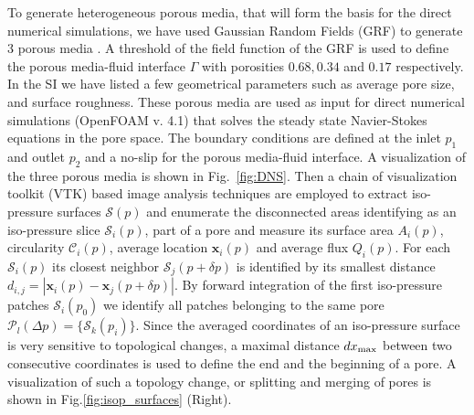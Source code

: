 \documentclass[draft]{agujournal2019}
\begin{document}
To generate heterogeneous porous media, that will form the basis for the direct numerical simulations, we have used Gaussian Random Fields (GRF) to generate 3 porous media \cite{teubner_level_1991,hyman_heterogeneities_2012,siena_relationship_2014}. A threshold of the field function of the GRF is used to define the porous media-fluid interface $\Gamma$ with porosities $0.68, 0.34$ and $0.17$ respectively. In the SI we have listed a few geometrical parameters such as average pore size, and surface roughness. These porous media are used as input for direct numerical simulations (OpenFOAM v. 4.1) \cite{weller_tensorial_1998} that solves the steady state Navier-Stokes equations in the pore space. The boundary conditions are defined at the inlet $p_1$ and outlet $p_2$ and a no-slip for the porous media-fluid interface. A visualization of the three porous media is shown in Fig.~\ref{fig:DNS}. Then a chain of visualization toolkit (VTK) based image analysis techniques \cite{schroeder_visualization_2006,hernderson_paraview_2007} are employed to extract iso-pressure surfaces $\mathcal{S}(p)$ and enumerate the disconnected areas identifying as an iso-pressure slice $\mathcal{S}_i(p)$, part of a pore and measure its surface area $A_i(p)$, circularity $\mathcal{C}_i(p)$, average location $\mathbf{x}_i(p)$ and average flux $Q_i(p)$. For each $\mathcal{S}_i(p)$ its closest neighbor $\mathcal{S}_j(p+\delta p)$ is identified by its smallest distance $d_{i,j}= \left|  \mathbf{x}_i(p)-\mathbf{x}_j(p+\delta p)\right|$. By forward integration of the first iso-pressure patches $\mathcal{S}_i(p_0)$ we identify all patches belonging to the same pore $\mathcal{P}_l(\Delta p) = \{\mathcal{S}_k(p_i)\}$. Since the averaged coordinates of an iso-pressure surface is very sensitive to topological changes, a maximal distance $dx_{\rm{max}}$ between two consecutive coordinates is used to define the end and the beginning of a pore. A visualization of such a topology change, or splitting and merging of pores is shown in Fig.\ref{fig:isop_surfaces} (Right).
\end{document}
